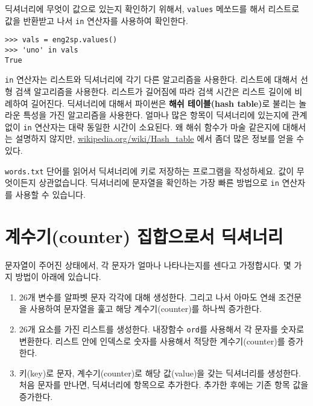 딕셔너리에 무엇이 값으로 있는지 확인하기 위해서, {\tt values} 메쏘드를 해서 리스트로 값을 반환받고 나서 {\tt in} 연산자를 사용하여 확인한다.  


\beforeverb
\begin{verbatim}
>>> vals = eng2sp.values()
>>> 'uno' in vals
True
\end{verbatim}
\afterverb
%

{\tt in} 연산자는 리스트와 딕셔너리에 각기 다른 알고리즘을 사용한다. 
리스트에 대해서 선형 검색 알고리즘을 사용한다.
리스트가 길어짐에 따라 검색 시간은 리스트 길이에 비례하여 길어진다. 
딕셔너리에 대해서 파이썬은 {\bf 해쉬 테이블(hash table)}로 불리는 놀라운 특성을 가진 알고리즘을 사용한다. 
얼마나 많은 항목이 딕셔너리에 있는지에 관계없이 {\tt in} 연산자는 대략 동일한 시간이 소요된다.
왜 해쉬 함수가 마술 같은지에 대해서는 설명하지 않지만, \url{wikipedia.org/wiki/Hash_table} 에서 좀더 많은 정보를 얻을 수 있다. 


\begin{ex}
\label{wordlist2}


{\tt words.txt} 단어를 읽어서 딕셔너리에 키로 저장하는 프로그램을 작성하세요.
값이 무엇이든지 상관없습니다. 
딕셔너리에 문자열을 확인하는 가장 빠른 방법으로 {\tt in} 연산자를 사용할 수 있습니다.

\end{ex}


\section{계수기(counter) 집합으로서 딕셔너리}
\label{histogram}


문자열이 주어진 상태에서, 각 문자가 얼마나 나타나는지를 센다고 가정합시다.
몇 가지 방법이 아래에 있습니다.

\begin{enumerate}

\item 26개 변수를 알파벳 문자 각각에 대해 생성한다. 
그리고 나서 아마도 연쇄 조건문을 사용하여 문자열을 훑고 해당 계수기(counter)를 하나씩 증가한다.

\item 26개 요소를 가진 리스트를 생성한다. 
내장함수 {\tt ord}를 사용해서 각 문자를 숫자로 변환한다. 
리스트 안에 인덱스로 숫자를 사용해서 적당한 계수기(counter)를 증가한다.

\item 키(key)로 문자, 계수기(counter)로 해당 값(value)을 갖는 딕셔너리를 생성한다. 
처음 문자를 만나면, 딕셔너리에 항목으로 추가한다.
추가한 후에는 기존 항목 값을 증가한다.

\end{enumerate}

